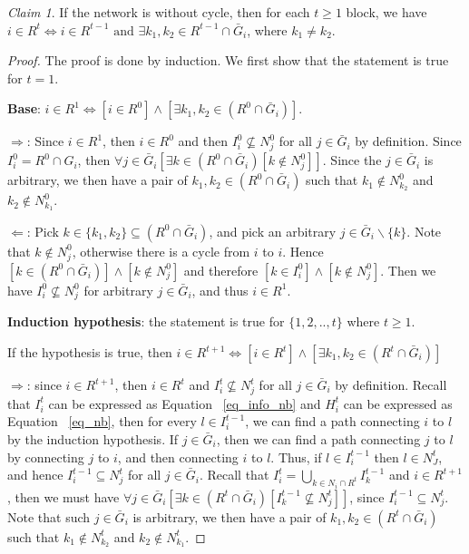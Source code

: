 \documentclass[12pt,letter]{article}
\theoremstyle{definition}
\theoremstyle{remark}
\theoremstyle{claim}
\newtheorem{claim}{Claim}
\begin{document}
\begin{claim}
\label{lemma1}
If the network is without cycle, then for each $t\geq 1$ block, we have $i\in R^t\Leftrightarrow i\in R^{t-1} \text{ and } \exists k_1,k_2\in R^{t-1}\cap \bar{G}_i$, where $k_1\neq k_2$.
\end{claim}
\begin{proof}
The proof is done by induction. We first show that the statement is true for $t=1$. 

\textbf{Base}: $i\in R^1\Leftrightarrow [i\in R^0] \wedge [\exists k_1,k_2\in (R^0\cap \bar{G}_i)]$. 

$\Rightarrow$: Since $i\in R^1$, then $i\in R^0$ and then $I^0_i\nsubseteq N^0_j$ for all $j\in \bar{G}_i$ by definition. Since $I^0_i=R^0\cap G_i$, then $\forall j\in \bar{G}_i [\exists k\in (R^0\cap \bar{G}_i) [k\notin N^0_j]]$. Since the $j\in \bar{G}_i$ is arbitrary,  we then have a pair of $k_1, k_2 \in (R^0\cap \bar{G}_i)$ such that $k_1\notin N^0_{k_2}$ and $k_2\notin N^0_{k_1}$.

$\Leftarrow$: Pick $k\in \{k_1,k_2\}\subseteq (R^0\cap \bar{G}_i)$, and pick an arbitrary $j\in \bar{G}_i\backslash \{k\}$. Note that $k\notin N^0_j$, otherwise there is a cycle from $i$ to $i$. Hence $[k\in (R^0\cap \bar{G}_i)] \wedge [k\notin N^0_j]$ and therefore $[k\in I^0_i] \wedge [k\notin N^0_j]$. Then we have $I^0_i\nsubseteq N^0_j$ for arbitrary $j\in \bar{G}_i$, and thus $i\in R^1$.

\textbf{Induction hypothesis}: the statement is true for $\{1,2,..,t\}$ where $t\geq 1$. 


If the hypothesis is true, then $i\in R^{t+1}\Leftrightarrow [i\in R^{t}] \wedge [\exists k_1,k_2\in (R^{t}\cap \bar{G}_i)]$


$\Rightarrow$: since $i\in R^{t+1}$, then $i\in R^t$ and $I^t_i\nsubseteq N^t_j$ for all $j\in \bar{G}_i$ by definition. Recall that $I^t_i$ can be expressed as Equation ~\ref{eq_info_nb} and $H^t_i$ can be expressed as Equation ~\ref{eq_nb}, then for every $l\in I^{t-1}_i$, we can find a path connecting $i$ to $l$ by the induction hypothesis. If $j\in \bar{G}_i$, then we can find a path connecting $j$ to $l$ by connecting $j$ to $i$, and then connecting $i$ to $l$. Thus, if $l\in I^{t-1}_i$ then $l\in N^t_J$, and hence $I^{t-1}_i\subseteq N^t_{j}$ for all $j\in \bar{G}_i$. Recall that $I^t_i = \bigcup_{k\in N_i\cap R^t}I^{t-1}_k$ and $i\in R^{t+1}$, then we must have $\forall j\in \bar{G}_i [\exists k\in (R^t\cap \bar{G}_i)[ I^{t-1}_k\nsubseteq N^t_j]]$, since $I^{t-1}_i\subseteq N^t_{j}$. Note that such $j\in \bar{G}_i$ is arbitrary,  we then have a pair of $k_1, k_2 \in (R^{t}\cap \bar{G}_i)$ such that $k_1\notin N^t_{k_2}$ and $k_2\notin N^t_{k_1}$.
\bigskip


\end{proof}
\end{document}
